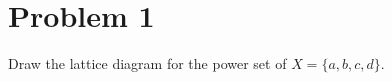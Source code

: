 \documentclass[12pt]{article}
\title{\scalebox{2}{Math 431 Homework 6}}
\author{\scalebox{1.5}{Theo Koss}}
\date{November 2020}
\begin{document}
\maketitle
\section{Problem 1}
Draw the lattice diagram for the power set of $X=\{a,b,c,d\}$.
\newline{}
\end{document}

